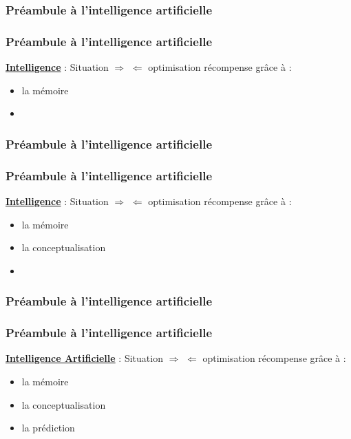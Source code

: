 \documentclass{formation}
\begin{document}
\begin{frame}
  \frametitle{Préambule à l'intelligence artificielle}
\end{frame}

\begin{frame}
  \frametitle{Préambule à l'intelligence artificielle}
  \underline{\textbf{Intelligence}} :
  \newline
  \newline
  Situation $\Rightarrow$  $\Leftarrow$ optimisation récompense
  \newline
  grâce à :
  \begin{itemize}
  \item la mémoire
  \item {}
  \end{itemize}
\end{frame}

\begin{frame}
  \frametitle{Préambule à l'intelligence artificielle}
\end{frame}

\begin{frame}
  \frametitle{Préambule à l'intelligence artificielle}
  \underline{\textbf{Intelligence}} :
  \newline
  \newline
  Situation $\Rightarrow$  $\Leftarrow$ optimisation récompense
  \newline
  grâce à :
  \begin{itemize}
  \item la mémoire
  \item la conceptualisation
  \item {}
  \end{itemize}
\end{frame}

\begin{frame}
  \frametitle{Préambule à l'intelligence artificielle}
  \begin{center}
    \huge{}
  \end{center}
\end{frame}

\begin{frame}
  \frametitle{Préambule à l'intelligence artificielle}
  \underline{\textbf{Intelligence Artificielle}} :
  \newline
  \newline
  Situation $\Rightarrow$  $\Leftarrow$ optimisation récompense
  \newline
  grâce à :
  \begin{itemize}
  \item la mémoire
  \item la conceptualisation
  \item la prédiction
  \end{itemize}
\end{frame}
\end{document}
